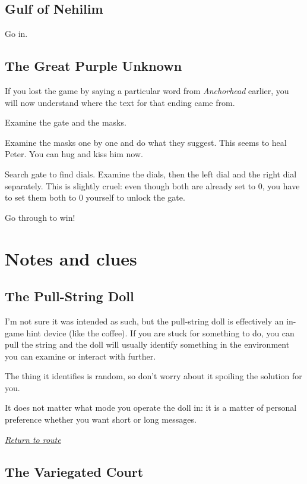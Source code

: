 \documentclass[a5paper]{extarticle}
\begin{document}
\newpage
\subsection{Gulf of Nehilim}\label{sec:sol-Gulf-of-Nehilim}

Go in.

\vfill
\subsection{The Great Purple Unknown}

If you lost the game by saying a particular word from \emph{Anchorhead} earlier,
you will now understand where the text for that ending came from.

Examine the gate and the masks.

Examine the masks one by one and do what they suggest.
This seems to heal Peter. You can hug and kiss him now.

Search gate to find dials. Examine the dials, then the left dial and the right dial separately.
This is slightly cruel: even though both are already set to 0,
you have to set them both to 0 yourself to unlock the gate.

Go through to win!

\newpage
\section{Notes and clues}\label{sec:nb}

\subsection{The Pull-String Doll}\label{sec:nb-doll}

I'm not sure it was intended as such,
but the pull-string doll is effectively an in-game hint device (like the coffee).
If you are stuck for something to do,
you can pull the string and the doll will usually identify something in the
environment you can examine or interact with further.

The thing it identifies is random,
so don't worry about it spoiling the solution for you.

It does not matter what mode you operate the doll in:
it is a matter of personal preference whether you want short or long messages.

\hyperref[sec:route]{\emph{Return to route}}

\newpage
\subsection{The Variegated Court}\label{sec:nb-Variegated-Court}
\end{document}
